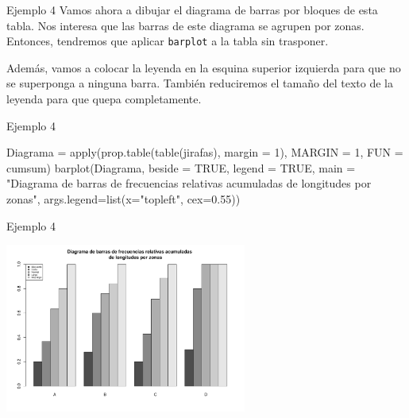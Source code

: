 \documentclass[
  ignorenonframetext,
  aspectratio=169]{beamer}
\newenvironment{Shaded}{\begin{snugshade}}{\end{snugshade}}
\newcommand{\AttributeTok}[1]{\textcolor[rgb]{0.77,0.63,0.00}{#1}}
\newcommand{\ConstantTok}[1]{\textcolor[rgb]{0.00,0.00,0.00}{#1}}
\newcommand{\DecValTok}[1]{\textcolor[rgb]{0.00,0.00,0.81}{#1}}
\newcommand{\FloatTok}[1]{\textcolor[rgb]{0.00,0.00,0.81}{#1}}
\newcommand{\FunctionTok}[1]{\textcolor[rgb]{0.00,0.00,0.00}{#1}}
\newcommand{\NormalTok}[1]{#1}
\newcommand{\OtherTok}[1]{\textcolor[rgb]{0.56,0.35,0.01}{#1}}
\newcommand{\StringTok}[1]{\textcolor[rgb]{0.31,0.60,0.02}{#1}}
\begin{document}
\begin{frame}[fragile]{Ejemplo 4}
\protect\hypertarget{ejemplo-4-5}{}
Vamos ahora a dibujar el diagrama de barras por bloques de esta tabla.
Nos interesa que las barras de este diagrama se agrupen por zonas.
Entonces, tendremos que aplicar \texttt{barplot} a la tabla sin
trasponer.

Además, vamos a colocar la leyenda en la esquina superior izquierda para
que no se superponga a ninguna barra. También reduciremos el tamaño del
texto de la leyenda para que quepa completamente.
\end{frame}

\begin{frame}[fragile]{Ejemplo 4}
\protect\hypertarget{ejemplo-4-6}{}
\begin{Shaded}
\begin{Highlighting}[]
\NormalTok{Diagrama }\OtherTok{=} \FunctionTok{apply}\NormalTok{(}\FunctionTok{prop.table}\NormalTok{(}\FunctionTok{table}\NormalTok{(jirafas), }\AttributeTok{margin =} \DecValTok{1}\NormalTok{),}
                 \AttributeTok{MARGIN =} \DecValTok{1}\NormalTok{, }\AttributeTok{FUN =}\NormalTok{ cumsum)}
\FunctionTok{barplot}\NormalTok{(Diagrama, }\AttributeTok{beside =} \ConstantTok{TRUE}\NormalTok{, }\AttributeTok{legend =} \ConstantTok{TRUE}\NormalTok{,}
\AttributeTok{main =} \StringTok{"Diagrama de barras de frecuencias relativas acumuladas }
\StringTok{        de longitudes por zonas"}\NormalTok{,}
\AttributeTok{args.legend=}\FunctionTok{list}\NormalTok{(}\AttributeTok{x=}\StringTok{"topleft"}\NormalTok{, }\AttributeTok{cex=}\FloatTok{0.55}\NormalTok{))}
\end{Highlighting}
\end{Shaded}
\end{frame}

\begin{frame}{Ejemplo 4}
\protect\hypertarget{ejemplo-4-7}{}
\begin{center}\includegraphics[width=300px]{Hora4_files/figure-beamer/unnamed-chunk-19-1} \end{center}
\end{frame}
\end{document}
